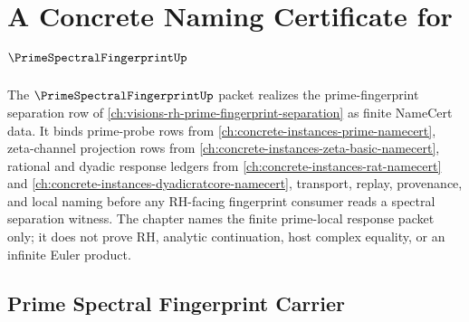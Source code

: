 \chapter{A Concrete Naming Certificate for $\PrimeSpectralFingerprintUp$}
\label{ch:concrete-instances-prime-spectral-fingerprint-namecert}

The $\PrimeSpectralFingerprintUp$ packet realizes the prime-fingerprint separation row of \autoref{ch:visions-rh-prime-fingerprint-separation} as finite NameCert data. It binds prime-probe rows from \autoref{ch:concrete-instances-prime-namecert}, zeta-channel projection rows from \autoref{ch:concrete-instances-zeta-basic-namecert}, rational and dyadic response ledgers from \autoref{ch:concrete-instances-rat-namecert} and \autoref{ch:concrete-instances-dyadicratcore-namecert}, transport, replay, provenance, and local naming before any RH-facing fingerprint consumer reads a spectral separation witness. The chapter names the finite prime-local response packet only; it does not prove RH, analytic continuation, host complex equality, or an infinite Euler product.

\section{Prime Spectral Fingerprint Carrier}
\label{sec:prime-spectral-fingerprint-carrier}

